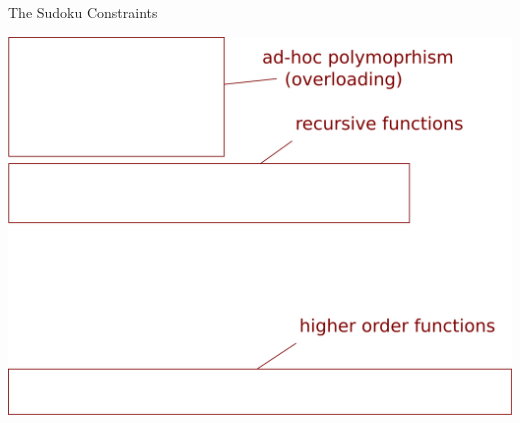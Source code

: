 \documentclass{beamer}
\begin{document}
\begin{frame}{The Sudoku Constraints}
\begin{overprint}
 \includegraphics[width=\textwidth]{isvalid10}
\end{overprint}
\end{frame}
\end{document}
